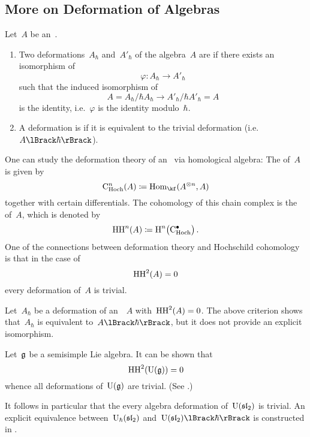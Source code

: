 \documentclass[a4paper, 11pt, oneside]{scrartcl}
\begin{document}
\subsection{More on Deformation of Algebras}
\label{more on deformations of algebras}

\begin{definition}
  Let~$A$ be an~\algebra{$\kf$}.
  \begin{enumerate}
    \item
      Two deformations~$A_\hbar$ and~$A'_\hbar$ of the algebra~$A$ are  if there exists an isomorphism of~\algebras{$\kfhbar$}
      \[
        \varphi
        \colon
        A_\hbar
        \to
        A'_\hbar
      \]
      such that the induced isomorphism of~\algebras{$\kf$}
      \[
        A
        =
        A_\hbar / \hbar A_\hbar
        \to
        A'_\hbar / \hbar A'_\hbar
        = A
      \]
      is the identity, i.e.~$\varphi$ is the identity modulo~$\hbar$.
    \item
      A deformation is  if it is equivalent to the trivial deformation (i.e.~$\power{A}{\hbar}$).
  \end{enumerate}
\end{definition}

\begin{remark}
  One can study the deformation theory of an~\algebra{$\kf$} via homological algebra:
  The  of~$A$ is given by
  \[
    \CHoch^n(A)
    \defined
    \Hom_{\kf}(A^{\tensor n}, A)
  \]
  together with certain differentials.
  The cohomology of this chain complex is the  of~$A$, which is denoted by
  \[
    \HH^n(A)
    \defined
    \Homology^n\bigl( \CHoch^\bullet \bigr) \,.
  \]
  One of the connections between deformation theory and Hochschild cohomology is that in the case of
  \[
    \operatorname{HH}^2(A) = 0
  \]
  every deformation of~$A$ is trivial.
\end{remark}

\begin{warning}
  Let~$A_\hbar$ be a deformation of an~\algebra{$\kf$}~$A$ with~$\operatorname{HH}^2(A) = 0$.
  The above criterion shows that~$A_\hbar$ is equivalent to~$\power{A}{\hbar}$, but it does not provide an explicit isomorphism.
\end{warning}

\begin{example}
  Let~$\mathfrak{g}$ be a semisimple Lie algebra.
  It can be shown that
  \[
    \operatorname{HH}^2( \operatorname{U}(\mathfrak{g}) ) = 0
  \]
  whence all deformations of~$\operatorname{U}(\mathfrak{g})$ are trivial.
  (See \cite[Theorem~2]{gerstenhaber_quantum}.)

  It follows in particular that the every algebra deformation of~$\operatorname{U}(\mathfrak{sl}_2)$ is trivial.
  An explicit equivalence between~$\operatorname{U}_{\hbar}(\mathfrak{sl}_2)$ and~$\power{\Univ(\sllie_2)}{\hbar}$ is constructed in \cite[Proposition~4.6.4]{guide_to_quantum_groups}.
\end{example}
\end{document}
